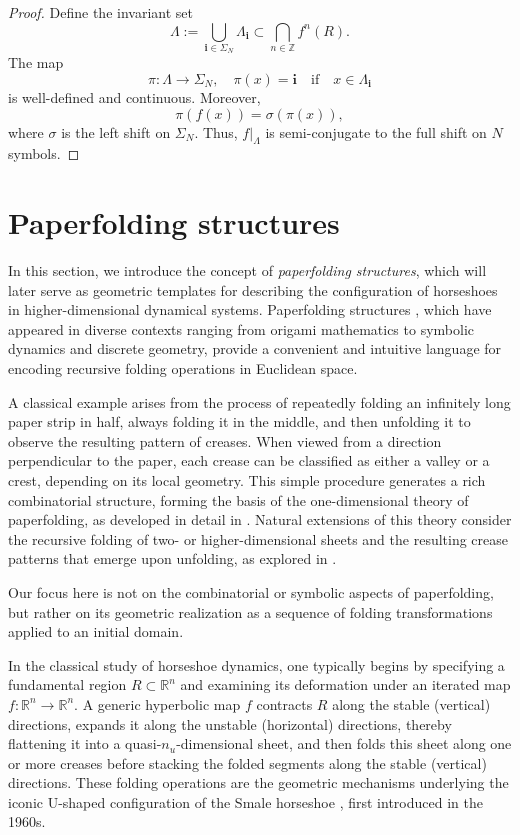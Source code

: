 \documentclass[12pt]{iopart}
\begin{document}
\begin{proof}
Define the invariant set
\[
\Lambda := \bigcup_{\mathbf{i} \in \Sigma_N} \Lambda_{\mathbf{i}} \subset \bigcap_{n \in \mathbb{Z}} f^n(R).
\]
The map
\[
\pi : \Lambda \to \Sigma_N, \quad \pi(x) = \mathbf{i}\quad \mathrm{ if }\quad x \in \Lambda_{\mathbf{i}}
\]
is well-defined and continuous. Moreover,
\[
\pi(f(x)) = \sigma(\pi(x)),
\]
where \( \sigma \) is the left shift on \( \Sigma_N \). Thus, \( f|_\Lambda \) is semi-conjugate to the full shift on \( N \) symbols.
\end{proof}





\section{Paperfolding structures}
\label{Paperfolding structures}

In this section, we introduce the concept of \emph{paperfolding structures}, which will later serve as geometric templates for describing the configuration of horseshoes in higher-dimensional dynamical systems. Paperfolding structures \cite{Dekking82a,Dekking82b,Dekking82c,Dekking12,Ben-Abraham13,Gahler14}, which have appeared in diverse contexts ranging from origami mathematics to symbolic dynamics and discrete geometry, provide a convenient and intuitive language for encoding recursive folding operations in Euclidean space. 

A classical example arises from the process of repeatedly folding an infinitely long paper strip in half, always folding it in the middle, and then unfolding it to observe the resulting pattern of creases. When viewed from a direction perpendicular to the paper, each crease can be classified as either a valley or a crest, depending on its local geometry. This simple procedure generates a rich combinatorial structure, forming the basis of the one-dimensional theory of paperfolding, as developed in detail in \cite{Dekking82a,Dekking82b,Dekking82c}. Natural extensions of this theory consider the recursive folding of two- or higher-dimensional sheets and the resulting crease patterns that emerge upon unfolding, as explored in \cite{Dekking12,Ben-Abraham13,Gahler14}. 

Our focus here is not on the combinatorial or symbolic aspects of paperfolding, but rather on its geometric realization as a sequence of folding transformations applied to an initial domain.

In the classical study of horseshoe dynamics, one typically begins by specifying a fundamental region \( R \subset \mathbb{R}^n \) and examining its deformation under an iterated map \( f: \mathbb{R}^n \to \mathbb{R}^n \). A generic hyperbolic map \( f \) contracts \( R \) along the stable (vertical) directions, expands it along the unstable (horizontal) directions, thereby flattening it into a quasi-\( n_u \)-dimensional sheet, and then folds this sheet along one or more creases before stacking the folded segments along the stable (vertical) directions. These folding operations are the geometric mechanisms underlying the iconic U-shaped configuration of the Smale horseshoe \cite{Smale65,Smale67}, first introduced in the 1960s.
\end{document}
